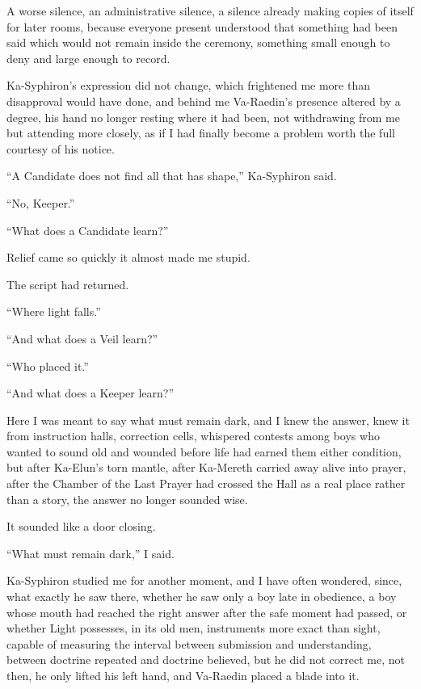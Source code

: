 A worse silence, an administrative silence, a silence already making copies of itself for later rooms, 
because everyone present understood that something had been said which would not remain inside the ceremony, 
something small enough to deny and large enough to record.\par

Ka-Syphiron’s expression did not change, which frightened me more than disapproval would have done, and 
behind me Va-Raedin’s presence altered by a degree, his hand no longer resting where it had been, not 
withdrawing from me but attending more closely, as if I had finally become a problem worth the full courtesy 
of his notice.\par

“A Candidate does not find all that has shape,” Ka-Syphiron said.\par
“No, Keeper.”\par
“What does a Candidate learn?”\par
Relief came so quickly it almost made me stupid.\par
The script had returned.\par
“Where light falls.”\par
“And what does a Veil learn?”\par
“Who placed it.”\par
“And what does a Keeper learn?”\par

Here I was meant to say what must remain dark, and I knew the answer, knew it from instruction halls, 
correction cells, whispered contests among boys who wanted to sound old and wounded before life had earned 
them either condition, but after Ka-Elun’s torn mantle, after Ka-Mereth carried away alive into prayer, 
after the Chamber of the Last Prayer had crossed the Hall as a real place rather than a story, the answer 
no longer sounded wise.\par

It sounded like a door closing.\par
“What must remain dark,” I said.\par


Ka-Syphiron studied me for another moment, and I have often wondered, since, what exactly he saw there, 
whether he saw only a boy late in obedience, a boy whose mouth had reached the right answer after the 
safe moment had passed, or whether Light possesses, in its old men, instruments more exact than sight, 
capable of measuring the interval between submission and understanding, between doctrine repeated and 
doctrine believed, but he did not correct me, not then, he only lifted his left hand, and Va-Raedin 
placed a blade into it.\par

